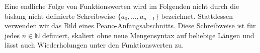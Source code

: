\documentclass[main.tex]{subfiles}
\begin{document}
Eine endliche Folge von Funktionswerten wird im Folgenden nicht durch die
bislang nicht definierte Schreibweise
\(\{a_0,\ldots,a_{n-1}\}\) bezeichnet. Stattdessen verwenden wir das Bild
eines Peano-Anfangsabschnitts. Diese Schreibweise ist f\"ur jedes
\(n\in\mathbb N\) definiert, skaliert ohne neue Mengensyntax auf beliebige
L\"angen und l\"asst auch Wiederholungen unter den Funktionswerten zu.


\begin{tabproofwide}
\end{tabproofwide}
\end{document}
